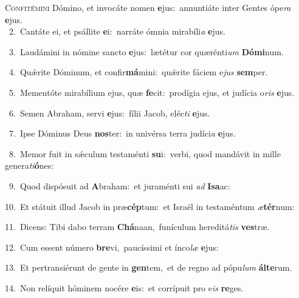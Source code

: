 \lettrine{\initial\textcolor{\initialcolor}{C}}{onfitémini} Dómino, et invocáte nomen \textbf{e}\-jus:~\star annuntiáte inter Gentes ópe\textit{ra} \textbf{e}\-jus.\\
{\numbfont\textcolor{\numbcolor}{~2.}}~Cantáte ei, et psállite \textbf{e}\-i:~\star narráte ómnia mirabíli\textit{a} \textbf{e}\-jus.\par
{\numbfont\textcolor{\numbcolor}{~3.}}~Laudámini in nómine sancto \textbf{e}\-jus:~\star lætétur cor quærénti\textit{um} \textbf{Dó}\-\textbf{mi}num.\par
{\numbfont\textcolor{\numbcolor}{~4.}}~Quǽrite Dóminum, et confir\-\textbf{má}\-mini:~\star quǽrite fáciem e\textit{jus} \textbf{sem}\-per.\par
{\numbfont\textcolor{\numbcolor}{~5.}}~Mementóte mirabílium ejus, quæ \textbf{fe}\-cit:~\star prodígia ejus, et judícia o\textit{ris} \textbf{e}\-jus.\par
{\numbfont\textcolor{\numbcolor}{~6.}}~Semen Abraham, servi \textbf{e}\-jus:~\star fílii Jacob, eléc\textit{ti} \textbf{e}\-jus.\par
{\numbfont\textcolor{\numbcolor}{~7.}}~Ipse Dóminus Deus \textbf{nos}\-ter:~\star in univérsa terra judíci\textit{a} \textbf{e}\-jus.\par
{\numbfont\textcolor{\numbcolor}{~8.}}~Memor fuit in sǽculum testaménti \textbf{su}\-i:~\star verbi, quod mandávit in mille genera\-\textit{ti}\-\textbf{ó}nes:\par
{\numbfont\textcolor{\numbcolor}{~9.}}~Quod dispósuit ad \textbf{A}\-braham:~\star et juraménti sui \textit{ad} \textbf{I}\-\textbf{sa}ac:\par
{\numbfont\textcolor{\numbcolor}{10.}}~Et státuit illud Jacob in præ\-\textbf{cép}\-tum:~\star et Israël in testaméntum \textit{æ}\-\textbf{tér}num:\par
{\numbfont\textcolor{\numbcolor}{11.}}~Dicens: Tibi dabo terram \textbf{Chá}\-naan,~\star funículum hereditá\textit{tis} \textbf{ves}\-træ.\par
{\numbfont\textcolor{\numbcolor}{12.}}~Cum essent número \textbf{bre}\-vi,~\star paucíssimi et ínco\textit{læ} \textbf{e}\-jus:\par
{\numbfont\textcolor{\numbcolor}{13.}}~Et pertransiérunt de gente in \textbf{gen}\-tem,~\star et de regno ad pópu\textit{lum} \textbf{ál}\-\textbf{te}rum.\par
{\numbfont\textcolor{\numbcolor}{14.}}~Non relíquit hóminem nocére \textbf{e}\-is:~\star et corrípuit pro e\textit{is} \textbf{re}\-ges.\par
